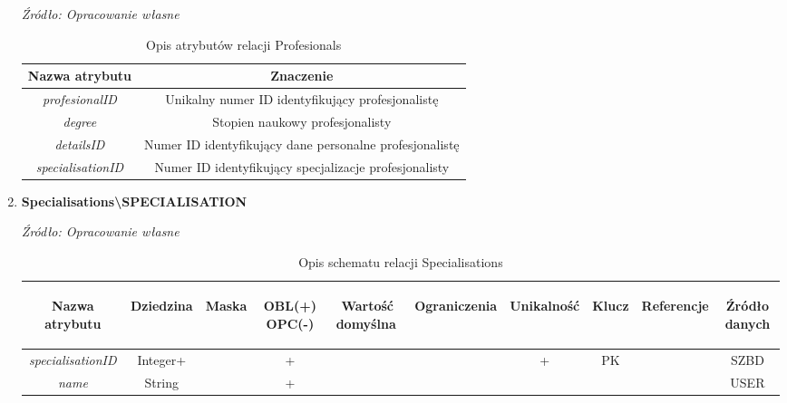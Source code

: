 \documentclass[12pt,oneside]{report}
\begin{document}
\begin{enumerate}[start=1,label={\bfseries REL\textbackslash0\arabic*}]
\begin{table}[H]
	\caption{Opis atrybutów relacji Profesionals}
	\textit{Źródło: Opracowanie własne}
	\label{ProfesionalsAttributeDescription}
	\centering
	\begin{tabular}{|c|c|}
		\hline
		Nazwa atrybutu & Znaczenie \\
			\hline
		\textit{profesionalID}& Unikalny numer ID identyfikujący profesjonalistę\\
		\hline
		\textit{degree}& Stopien naukowy profesjonalisty\\
		\hline
		\textit{detailsID}& Numer ID identyfikujący dane personalne profesjonalistę\\
		\hline
		\textit{specialisationID}&Numer ID identyfikujący specjalizacje profesjonalisty\\
		\hline
	\end{tabular}
\end{table}
\item \textbf{Specialisations\textbackslash SPECIALISATION}
\begin{table}[H]
	\caption{Opis schematu relacji Specialisations}
	\textit{Źródło: Opracowanie własne}
	\label{SpecialisationsRelationSchema}
	\centering
	\begin{tabular}{|c|c|c|c|c|c|c|c|c|c|}
		\hline
		\begin{sideways}Nazwa atrybutu\end{sideways}& 
		\begin{sideways}Dziedzina \end{sideways}& 
		\begin{sideways}Maska \end{sideways}& 
		\begin{sideways}OBL(+) OPC(-)\end{sideways} & 
		\begin{sideways}Wartość domyślna$\ $\end{sideways}& 
		\begin{sideways}Ograniczenia\end{sideways} &
		\begin{sideways}Unikalność \end{sideways}& 
		\begin{sideways}Klucz \end{sideways}& 
		\begin{sideways}Referencje \end{sideways}&
		\begin{sideways}Źródło danych\end{sideways}\\
		\hline
		\textit{specialisationID}&Integer+&&+&&&+&PK&&SZBD\\
		\hline
		\textit{name}&String&&+&&&&&&USER\\
		\hline
	\end{tabular}
\end{table}


\end{enumerate}
\end{document}
